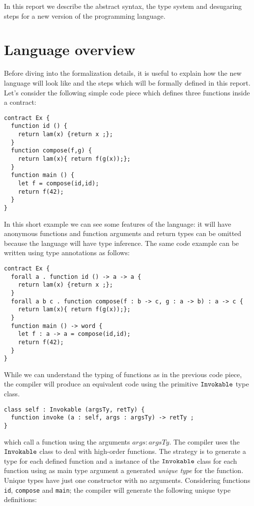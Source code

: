 \documentclass[a4paper, 11pt]{article}
\begin{document}
In this report we describe the abstract syntax, 
the type system and desugaring steps for a new 
version of the \solidity programming language.

\section{Language overview} 

Before diving into the formalization details, it 
is useful to explain how the new language will look like 
and the steps which will be formally defined in this 
report. Let's consider the following simple code 
piece which defines three functions inside a contract:

\begin{lstlisting}[language=solidity]
contract Ex {
  function id () {
    return lam(x) {return x ;};
  }
  function compose(f,g) {
    return lam(x){ return f(g(x));};
  }
  function main () {
    let f = compose(id,id);
    return f(42);
  }
}
\end{lstlisting}

In this short example we can see some features of the \solidity 
language: it will have anonymous functions and 
function arguments and return types can be omitted because 
the language will have type inference. The same code 
example can be written using type annotations as follows:

\begin{lstlisting}[language=solidity]
contract Ex {
  forall a . function id () -> a -> a {
    return lam(x) {return x ;};
  }
  forall a b c . function compose(f : b -> c, g : a -> b) : a -> c {
    return lam(x){ return f(g(x));};
  }
  function main () -> word {
    let f : a -> a = compose(id,id);
    return f(42);
  }
}
\end{lstlisting}

While we can understand the typing of functions as in the previous
code piece, the \solidity compiler will produce an equivalent 
code using the primitive $\mathtt{Invokable}$ type class. 

\begin{lstlisting}[language=solidity]
class self : Invokable (argsTy, retTy) {
  function invoke (a : self, args : argsTy) -> retTy ;
}
\end{lstlisting}
which call a function using the arguments $args : argsTy$. The compiler 
uses the $\mathtt{Invokable}$ class to deal with high-order functions. The 
strategy is to generate a type for each defined function and a 
instance of the $\mathtt{Invokable}$ class for each function using as main 
type argument a generated \emph{unique type} for the function. 
Unique types have just one constructor with no arguments. Considering 
functions \texttt{id}, \texttt{compose} and \texttt{main}; the compiler 
will generate the following unique type definitions:
\end{document}
